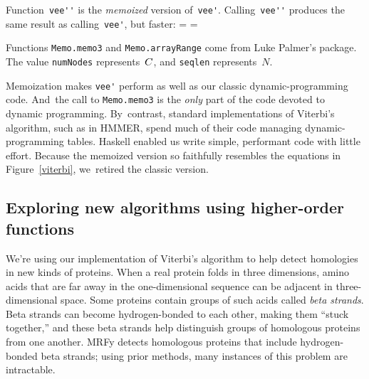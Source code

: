 \documentclass[preprint,nonatbib,blockstyle,times]{sigplanconf}
\newcommand\alignwidth{\ensuremath C} %
\newcommand\figref[1]{Figure~\ref{#1}}
\newcommand\seclabel[1]{\label{sec:#1}}
\newif\ifverbatimsmall
\newcommand\smallverbatiminput[1]{%
  \verbatimsmalltrue
  \presvtopsep=\topsep
  \topsep=0.78\topsep
  \verbatimsmallfalse
  \topsep=\presvtopsep
}
\begin{document}
Function~\verb+vee''+ is the \emph{memoized} version of~\verb+vee'+.
Calling~\verb+vee''+ produces the same result as calling~\verb+vee'+,
but faster: 
\smallverbatiminput{memo}
Functions \texttt{Memo.memo3} and \texttt{Memo.arrayRange} come from
Luke Palmer's
 package.
The value
\texttt{numNodes} represents~$\alignwidth$,
and \texttt{seqlen} represents~$N$.

Memoization makes \verb+vee'+ perform as well as our classic
dynamic-programming code.
And~the call to \texttt{Memo.memo3} is the \emph{only} part of the code
devoted to dynamic programming.
By~contrast, standard implementations of Viterbi's algorithm, such as in HMMER,
spend much of their code 
managing dynamic-programming tables.
Haskell enabled us write simple, performant code with little effort.
%
Because the memoized version so faithfully resembles the equations in
\figref{viterbi}, we~retired the classic version.





\subsection{Exploring new algorithms using higher-order functions}

\seclabel{hofs}
\seclabel{mrfy}

We're using our implementation of Viterbi's algorithm to help detect
homologies in new kinds of proteins.
When a real protein folds in three dimensions, 
amino acids 
that are far away in the one-dimensional sequence can be
adjacent in three-dimensional space.
Some proteins contain groups of such acids called \emph{beta
strands}.
Beta strands
can become hydrogen-bonded to each other,
making them ``stuck together,''
and these beta strands help distinguish groups of homologous
proteins from one another.
MRFy detects homologous proteins that include hydrogen-bonded beta
strands; using prior methods, many instances of this problem are
intractable. 
\end{document}
